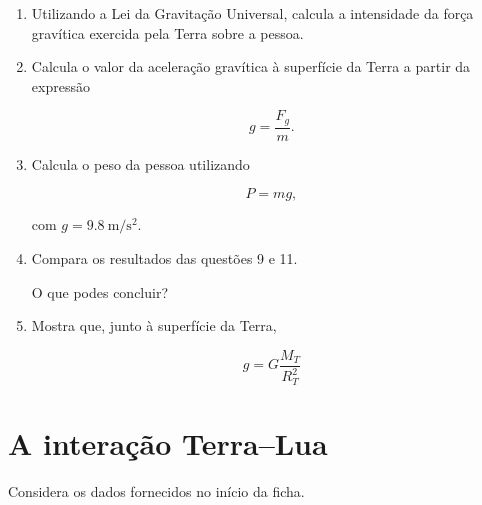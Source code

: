 \documentclass[11pt,a4paper]{article}
\newcommand{\resposta}[1][1]{
	\vspace{#1cm}
}
\begin{document}
	\begin{enumerate}[label=\textbf{\arabic*.},resume]
		
		\item Utilizando a Lei da Gravitação Universal, calcula a intensidade da
		força gravítica exercida pela Terra sobre a pessoa.
		
		\resposta[1.5]
		
		\item Calcula o valor da aceleração gravítica à superfície da Terra a partir
		da expressão
		
		\[
		g=\frac{F_g}{m}.
		\]
		
		\resposta[1.2]
		
		\item Calcula o peso da pessoa utilizando
		
		\[
		P=mg,
		\]
		
		com $g=\SI{9.8}{\metre\per\second\squared}$.
		
		\resposta[0.9]
		
		\item Compara os resultados das questões 9 e 11.
		
		O que podes concluir?
		
		\resposta[1.0]
		
		\item Mostra que, junto à superfície da Terra,
		
		\[
		\boxed{
			g=
			G\frac{M_T}{R_T^2}
		}
		\]
		
		\resposta[1.2]
		
	\end{enumerate}
	
	\section{A interação Terra--Lua}
	
	Considera os dados fornecidos no início da ficha.
	
\end{document}
